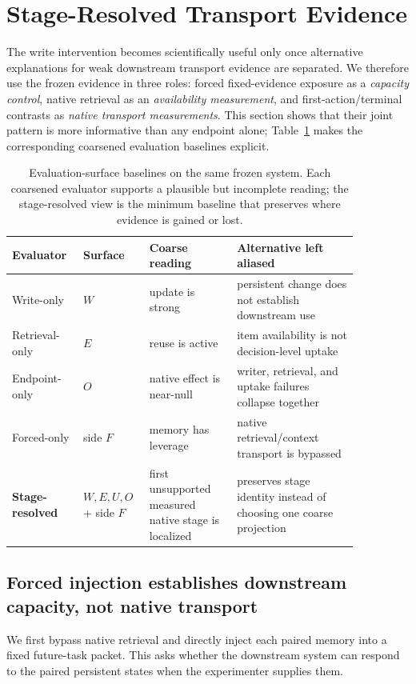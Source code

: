 \section{Stage-Resolved Transport Evidence}
\label{sec:variance}
The write intervention becomes scientifically useful only once alternative explanations for weak downstream transport evidence are separated. We therefore use the frozen evidence in three roles: forced fixed-evidence exposure as a \emph{capacity control}, native retrieval as an \emph{availability measurement}, and first-action/terminal contrasts as \emph{native transport measurements}. This section shows that their joint pattern is more informative than any endpoint alone; Table~\ref{tab:evaluation-surface-baselines} makes the corresponding coarsened evaluation baselines explicit.

\begin{table}[t]
\centering
\small
\caption{Evaluation-surface baselines on the same frozen system. Each coarsened evaluator supports a plausible but incomplete reading; the stage-resolved view is the minimum baseline that preserves where evidence is gained or lost.}
\label{tab:evaluation-surface-baselines}
\begin{tabular}{@{}p{0.16\linewidth}p{0.15\linewidth}p{0.23\linewidth}p{0.32\linewidth}@{}}
\toprule
Evaluator & Surface & Coarse reading & Alternative left aliased \\
\midrule
Write-only & $W$ & update is strong & persistent change does not establish downstream use \\
Retrieval-only & $E$ & reuse is active & item availability is not decision-level uptake \\
Endpoint-only & $O$ & native effect is near-null & writer, retrieval, and uptake failures collapse together \\
Forced-only & side $F$ & memory has leverage & native retrieval/context transport is bypassed \\
\textbf{Stage-resolved} & $W,E,U,O$ + side $F$ & first unsupported measured native stage is localized & preserves stage identity instead of choosing one coarse projection \\
\bottomrule
\end{tabular}
\end{table}

\subsection{Forced injection establishes downstream capacity, not native transport}
We first bypass native retrieval and directly inject each paired memory into a fixed future-task packet. This asks whether the downstream system can respond to the paired persistent states when the experimenter supplies them.

